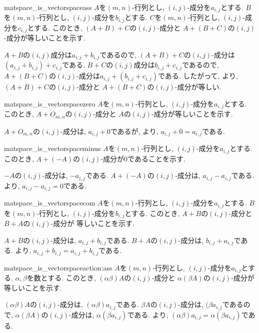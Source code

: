 \begin{proofof*}{matspace_is_vectorspace}{ass}
  $A$を$(m,n)$-行列とし, $(i,j)$-成分を$a_{i,j}$とする.
  $B$を$(m,n)$-行列とし, $(i,j)$-成分を$b_{i,j}$とする.
  $C$を$(m,n)$-行列とし, $(i,j)$-成分を$c_{i,j}$とする.
  このとき,
  $(A+B)+C$の$(i,j)$-成分と
  $A+(B+C)$の$(i,j)$-成分が等しいことを示す.

  $A+B$の$(i,j)$成分は$a_{i,j}+b_{i,j}$であるので,
  $(A+B)+C$の$(i,j)$-成分は$(a_{i,j}+b_{i,j})+c_{i,j}$である.
  $B+C$の$(i,j)$成分は$b_{i,j}+c_{i,j}$であるので,
  $A+(B+C)$の$(i,j)$-成分は$a_{i,j}+(b_{i,j}+c_{i,j})$である.
  したがって, より,
  $(A+B)+C$の$(i,j)$-成分と
  $A+(B+C)$の$(i,j)$-成分が等しい.
  
  
\end{proofof*}

\begin{proofof*}{matspace_is_vectorspace}{zero}
  $A$を$(m,n)$-行列とし, $(i,j)$-成分を$a_{i,j}$とする.
  このとき,
  $A+O_{m,n}$の$(i,j)$-成分と
  $A$の$(i,j)$-成分が等しいことを示す.

  $A+O_{m,n}$の$(i,j)$-成分は, $a_{i,j}+0$であるが,
  より,
  $a_{i,j}+0=a_{i,j}$である.
\end{proofof*}

\begin{proofof*}{matspace_is_vectorspace}{minus}
  $A$を$(m,n)$-行列とし, $(i,j)$-成分を$a_{i,j}$とする.
  このとき,
  $A+(-A)$の$(i,j)$-成分が$0$であることを示す.

  $-A$の$(i,j)$-成分は, $-a_{i,j}$である.
  $A+(-A)$の$(i,j)$-成分は, $a_{i,j}-a_{i,j}$である.
  より,
  $a_{i,j}-a_{i,j}=0$である.
\end{proofof*}

\begin{proofof*}{matspace_is_vectorspace}{com}
  $A$を$(m,n)$-行列とし, $(i,j)$-成分を$a_{i,j}$とする.
  $B$を$(m,n)$-行列とし, $(i,j)$-成分を$b_{i,j}$とする.
  このとき,
  $A+B$の$(i,j)$-成分と
  $B+A$の$(i,j)$-成分が
  等しいことを示す.
  
  $A+B$の$(i,j)$-成分は, $a_{i,j}+b_{i,j}$である.
  $B+A$の$(i,j)$-成分は, $b_{i,j}+a_{i,j}$である.
  より,
  $a_{i,j}+b_{i,j}=a_{i,j}+b_{i,j}$である.
\end{proofof*}
\begin{proofof*}{matspace_is_vectorspace}{action:ass}
  $A$を$(m,n)$-行列とし, $(i,j)$-成分を$a_{i,j}$とする.
  $\alpha,\beta$を数とする.
  このとき,
  $(\alpha\beta)A$の$(i,j)$-成分と
  $\alpha(\beta A)$の$(i,j)$-成分が
  等しいことを示す.

  $(\alpha\beta)A$の$(i,j)$-成分は, $(\alpha\beta)a_{i,j}$である.
  $\beta A$の$(i,j)$-成分は, $(\beta a_{i,j}$であるので,
  $\alpha(\beta A)$の$(i,j)$-成分は, $\alpha(\beta a_{i,j})$である.
  より,
  $(\alpha\beta)a_{i,j}=\alpha(\beta a_{i,j})$である.
\end{proofof*}

